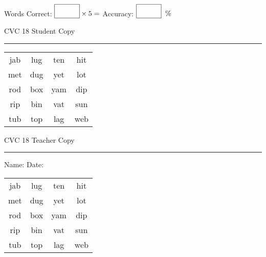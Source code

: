 \documentclass{memoir}
\begin{document}
\normalsize

Words Correct: $\fbox{\phantom{\huge 100}} \times 5 = $ Accuracy: $\fbox{\phantom{\huge 100}}\;\; \%$ 

\vfill

\newpage


\footnotesize \noindent
CVC 18 \hfill Student Copy
\smallskip
\hrule

\huge

\setlength{\tabcolsep}{14pt}
\def\arraystretch{2}

{\selectfont


\begin{vplace}[0.5]
\begin{center}
\begin{tabular}{cccc}
jab & lug & ten & hit \\
met & dug & yet & lot \\
rod & box & yam & dip \\
rip & bin & vat & sun \\
tub & top & lag & web \\
\end{tabular}
\end{center}
\end{vplace}

}

\newpage

\footnotesize \noindent
CVC 18 \hfill Teacher Copy
\smallskip
\hrule

\normalsize

\vfill

\noindent
Name: \underline{\hspace{1.75in}} \hfill Date: \underline{\hspace{1in}}

\huge

{\selectfont


\begin{vplace}[0.5]
\begin{center}
\begin{tabular}{cccc}
jab & lug & ten & hit \\
met & dug & yet & lot \\
rod & box & yam & dip \\
rip & bin & vat & sun \\
tub & top & lag & web \\
\end{tabular}
\end{center}
\end{vplace}



}
\end{document}
